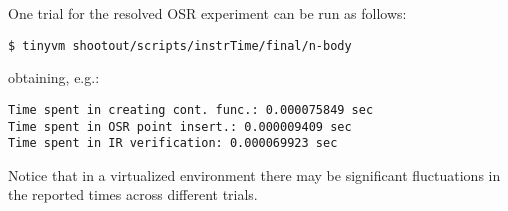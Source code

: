 \noindent One trial for the resolved OSR experiment can be run as follows:
\begin{small}
\begin{verbatim}
$ tinyvm shootout/scripts/instrTime/final/n-body
\end{verbatim}
\end{small}
\noindent obtaining, e.g.:
\begin{small}
\begin{verbatim}
Time spent in creating cont. func.: 0.000075849 sec
Time spent in OSR point insert.: 0.000009409 sec
Time spent in IR verification: 0.000069923 sec
\end{verbatim}
\end{small}

\noindent Notice that in a virtualized environment there may be significant fluctuations in the reported times across different trials.


